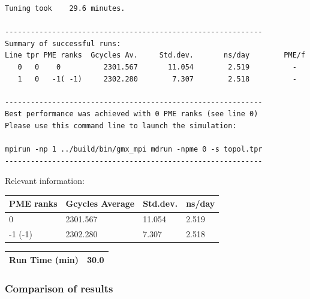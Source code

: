\begin{lstlisting}[frame=single]
Tuning took    29.6 minutes.

------------------------------------------------------------
Summary of successful runs:
Line tpr PME ranks  Gcycles Av.     Std.dev.       ns/day        PME/f
   0   0    0          2301.567       11.054        2.519          -  
   1   0   -1( -1)     2302.280        7.307        2.518          -  

------------------------------------------------------------
Best performance was achieved with 0 PME ranks (see line 0)
Please use this command line to launch the simulation:

mpirun -np 1 ../build/bin/gmx_mpi mdrun -npme 0 -s topol.tpr  
------------------------------------------------------------

\end{lstlisting}

Relevant information:
\begin{center}
    \begin{tabular}{|p{3.5cm}|p{3.5cm}|p{3.5cm}|p{3.5cm}|} \hline
         PME ranks & Gcycles Average & Std.dev. & ns/day \\ \hline
         0 & 2301.567  & 11.054  & 2.519  \\ \hline
         -1 (-1) & 2302.280 & 7.307 & 2.518  \\ \hline
    \end{tabular}
    \begin{tabular}{|p{3.5cm}|p{11.4cm}|} \hline
         Run Time (min) & 30.0 \\ \hline
    \end{tabular}
\end{center}
\subsubsection{Comparison of results}

